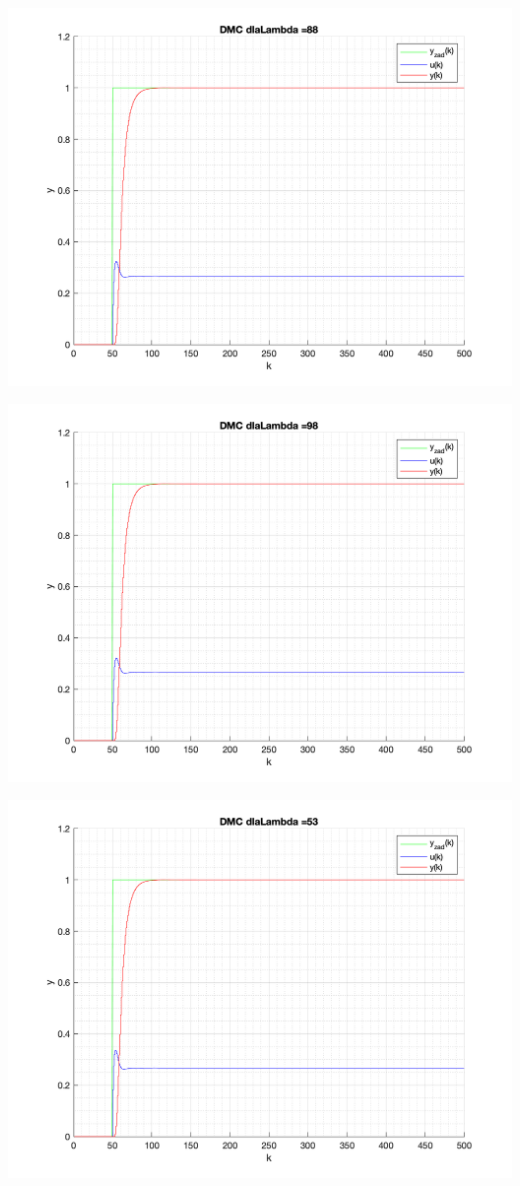 \documentclass[a4paper, 11pt]{article}
\begin{document}
\begin{enumerate}
 \includegraphics[width=\linewidth]{./ModelsP4_Lambda/P4_DMC_Lambda_88_png.png} 
 
 \includegraphics[width=\linewidth]{./ModelsP4_Lambda/P4_DMC_Lambda_98_png.png} 
 
 \includegraphics[width=\linewidth]{./ModelsP4_Lambda/P4_DMC_Lambda_53_png.png} 
 

\end{enumerate}
\end{document}
